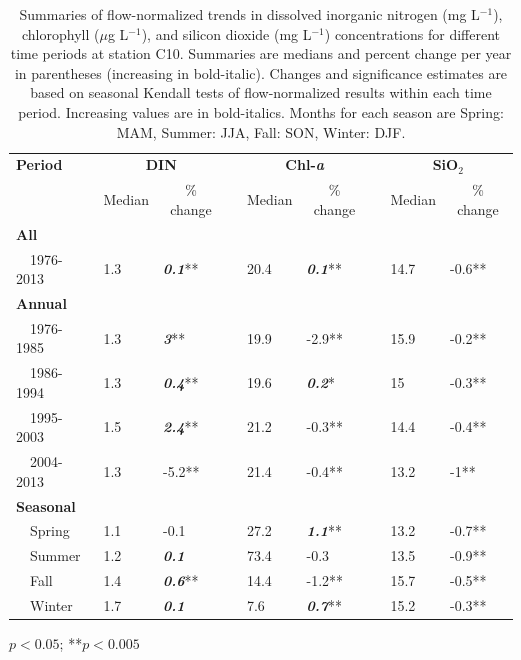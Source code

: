 \documentclass[letterpaper,12pt,oneside]{article}\usepackage[]{graphicx}\usepackage[]{color}
\begin{document}
\begin{table}[!tbp]
\caption{Summaries of flow-normalized trends in dissolved inorganic nitrogen (mg L$^{-1}$), chlorophyll ($\mu$g L$^{-1}$), and silicon dioxide (mg L$^{-1}$) concentrations for different time periods at station C10. Summaries are  medians and percent change per year in parentheses (increasing in bold-italic).  Changes and significance estimates are based on seasonal Kendall tests of flow-normalized results within each time period. Increasing values are in bold-italics. Months for each season are Spring: MAM, Summer: JJA, Fall: SON, Winter: DJF.\label{tab:c10chg}} 
\begin{center}
\begin{tabular}{lllcllcll}
\hline\hline
\multicolumn{1}{l}{\bfseries Period}&\multicolumn{2}{c}{\bfseries DIN}&\multicolumn{1}{c}{\bfseries }&\multicolumn{2}{c}{\bfseries Chl-\textit{a}}&\multicolumn{1}{c}{\bfseries }&\multicolumn{2}{c}{\bfseries SiO$_2$}\tabularnewline
\cline{2-3} \cline{5-6} \cline{8-9}
\multicolumn{1}{l}{}&\multicolumn{1}{c}{Median}&\multicolumn{1}{c}{\% change}&\multicolumn{1}{c}{}&\multicolumn{1}{c}{Median}&\multicolumn{1}{c}{\% change}&\multicolumn{1}{c}{}&\multicolumn{1}{c}{Median}&\multicolumn{1}{c}{\% change}\tabularnewline
\hline
{\bfseries All}&&&&&&&&\tabularnewline
~~1976-2013&1.3&\textit{\textbf{0.1}}**&&20.4&\textit{\textbf{0.1}}**&&14.7&-0.6**\tabularnewline
\hline
{\bfseries Annual}&&&&&&&&\tabularnewline
~~1976-1985&1.3&\textit{\textbf{3}}**&&19.9&-2.9**&&15.9&-0.2**\tabularnewline
~~1986-1994&1.3&\textit{\textbf{0.4}}**&&19.6&\textit{\textbf{0.2}}*&&15&-0.3**\tabularnewline
~~1995-2003&1.5&\textit{\textbf{2.4}}**&&21.2&-0.3**&&14.4&-0.4**\tabularnewline
~~2004-2013&1.3&-5.2**&&21.4&-0.4**&&13.2&-1**\tabularnewline
\hline
{\bfseries Seasonal}&&&&&&&&\tabularnewline
~~Spring&1.1&-0.1&&27.2&\textit{\textbf{1.1}}**&&13.2&-0.7**\tabularnewline
~~Summer&1.2&\textit{\textbf{0.1}}&&73.4&-0.3&&13.5&-0.9**\tabularnewline
~~Fall&1.4&\textit{\textbf{0.6}}**&&14.4&-1.2**&&15.7&-0.5**\tabularnewline
~~Winter&1.7&\textit{\textbf{0.1}}&&7.6&\textit{\textbf{0.7}}**&&15.2&-0.3**\tabularnewline
\hline
\end{tabular}\end{center}

\footnotesize *$p<0.05$; **$p<0.005$\end{table}
\end{document}
